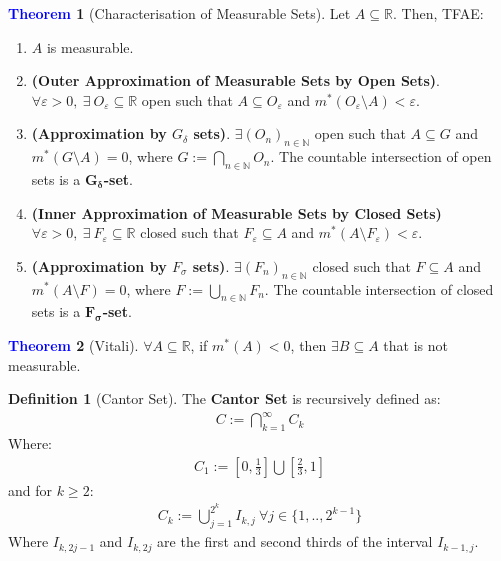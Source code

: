 \documentclass[11pt]{article}
\theoremstyle{definition}
\newtheorem{question}{Question}
\newcommand{\bb}[1]{\mathbb{#1}}
\newtheorem{theorem}{\textcolor{blue}{Theorem}}
\theoremstyle{definition}
\newtheorem{definition}{\textcolor{OliveGreen}{Definition}}
\theoremstyle{remark}
\begin{document}
\begin{theorem}[Characterisation of Measurable Sets] 
	Let $A \subseteq \bb{R}$. Then, TFAE: 
	\begin{enumerate}[nolistsep]
		\item $A$ is measurable. 
		\item \textbf{(Outer Approximation of Measurable Sets by Open Sets)}. $\forall \varepsilon > 0,\ \exists\ O_\varepsilon \subseteq \bb{R}$ open such that $A \subseteq O_\varepsilon$ and $m^*(O_\varepsilon \setminus A) < \varepsilon$. 
		\item \textbf{(Approximation by $G_\delta$ sets)}. $\exists (O_n)_{n \in \bb{N}}$ open such that $A \subseteq G$ and $m^*(G \setminus A) = 0$, where $G:= \bigcap_{n \in \bb{N}} O_n$. The countable intersection of open sets is a $\mathbf{G_\delta}$\textbf{-set}. 
		\item \textbf{(Inner Approximation of Measurable Sets by Closed Sets)} $\forall \varepsilon > 0,\ \exists\ F_\varepsilon \subseteq \bb{R}$ closed such that $F_\varepsilon \subseteq A$ and $m^*(A \setminus F_\varepsilon) < \varepsilon$. 
		\item \textbf{(Approximation by $F_\sigma$ sets)}. $\exists (F_n)_{n \in \bb{N}}$ closed such that $F \subseteq A$ and $m^*(A \setminus F) = 0$, where $F:= \bigcup_{n \in \bb{N}} F_n$. The countable intersection of closed sets is a $\mathbf{F_\sigma}$\textbf{-set}. 

	\end{enumerate}
\end{theorem}


\begin{theorem}[Vitali]
	$\forall A \subseteq \bb{R}$, if $m^*(A) < 0$, then $\exists B \subseteq A$ that is not measurable. 
\end{theorem}

\begin{definition}[Cantor Set]
	The \textbf{Cantor Set} is recursively defined as: 
	\begin{align}
		C := \bigcap_{k=1}^\infty C_k 
	\end{align}
	Where: 
	\begin{align*}
		C_1:= \left[ 0, \frac{1}{3}	\right] \bigcup \left[ 	\frac{2}{3}, 1 \right]
	\end{align*}
	and for $k \geq 2 $: 
	\begin{align*}
		C_k := \bigcup_{j=1}^{2^k} I_{k, j}\ \forall j \in \{ 1, .., 2^{k-1} \} 	
	\end{align*}
	Where $I_{k, 2j-1}$ and $I_{k, 2j}$ are the first and second thirds of the interval $I_{k-1, j}$. 

\end{definition}
\end{document}
